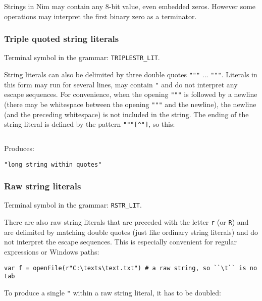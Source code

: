 Strings in Nim may contain any 8-bit value, even embedded zeros. However
some operations may interpret the first binary zero as a terminator.

\hypertarget{triple-quoted-string-literals}{%
\subsubsection{Triple quoted string
literals}\label{triple-quoted-string-literals}}

Terminal symbol in the grammar: \texttt{TRIPLESTR\_LIT}.

String literals can also be delimited by three double quotes
\texttt{"""} ... \texttt{"""}. Literals in this form may run for several
lines, may contain \texttt{"} and do not interpret any escape sequences.
For convenience, when the opening \texttt{"""} is followed by a newline
(there may be whitespace between the opening \texttt{"""} and the
newline), the newline (and the preceding whitespace) is not included in
the string. The ending of the string literal is defined by the pattern
\texttt{"""{[}\^{}"{]}}, so this:

\begin{verbatim}
\end{verbatim}

Produces:

\begin{verbatim}
"long string within quotes"
\end{verbatim}

\hypertarget{raw-string-literals}{%
\subsubsection{Raw string literals}\label{raw-string-literals}}

Terminal symbol in the grammar: \texttt{RSTR\_LIT}.

There are also raw string literals that are preceded with the letter
\texttt{r} (or \texttt{R}) and are delimited by matching double quotes
(just like ordinary string literals) and do not interpret the escape
sequences. This is especially convenient for regular expressions or
Windows paths:

\begin{verbatim}
var f = openFile(r"C:\texts\text.txt") # a raw string, so ``\t`` is no tab
\end{verbatim}

To produce a single \texttt{"} within a raw string literal, it has to be
doubled:


